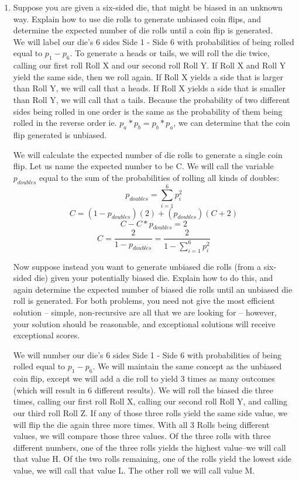 \documentclass[11pt, solution, letterpaper]{format}
\begin{document}
\begin{enumerate}

\item Suppose you are given a six-sided die, that might be biased in
an unknown way. Explain how to use die rolls to generate unbiased coin
flips, and determine the expected number of die rolls until a coin
flip is generated. \\

We will label our die's 6 sides Side 1 - Side 6 with probabilities of being rolled equal to $p_1 - p_6$. To generate a heads or tails, we will roll the die twice, calling our first roll Roll X and our second roll Roll Y. If Roll X and Roll Y yield the same side, then we roll again. If Roll X yields a side that is larger than Roll Y, we will call that a heads. If Roll X yields a side that is smaller than Roll Y, we will call that a tails. Because the probability of two different sides being rolled in one order is the same as the probability of them being rolled in the reverse order ie. $p_a*p_b = p_b*p_a$, we can determine that the coin flip generated is unbiased. 

We will calculate the expected number of die rolls to generate a single coin flip. Let us name the expected number to be C. We will call the variable $p_{doubles}$ equal to the sum of the probabilities of rolling all kinds of doubles:
$$p_{doubles} = \sum_{i=1}^{6} p_i^2 $$
$$C = (1 - p_{doubles})(2) + (p_{doubles})(C + 2) $$
$$C - C*p_{doubles} = 2 $$
$$C = \frac{2}{1 - p_{doubles}} = \frac{2}{1 - \sum_{i=1}^{6} p_i^2} $$



Now suppose instead you want to generate unbiased die
rolls (from a six-sided die) given your potentially biased die.
Explain how to do this, and again determine the expected number of
biased die rolls until an unbiased die roll is generated.  For both
problems, you need not give the most efficient solution -- simple,
non-recursive are all that we are looking for --  however, your
solution should be reasonable, and exceptional solutions will receive
exceptional scores.

We will number our die's 6 sides Side 1 - Side 6 with probabilities of being rolled equal to $p_1 - p_6$. We will maintain the same concept as the unbiased coin flip, except we will add a die roll to yield 3 times as many outcomes (which will result in 6 different results). We will roll the biased die three times, calling our first roll Roll X, calling our second roll Roll Y, and calling our third roll Roll Z. If any of those three rolls yield the same side value, we will flip the die again three more times. With all 3 Rolls being different values, we will compare those three values. Of the three rolls with three different numbers, one of the three rolls yields the highest value--we will call that value H. Of the two rolls remaining, one of the rolls yield the lowest side value, we will call that value L. The other roll we will call value M. 


\end{enumerate}
\end{document}
